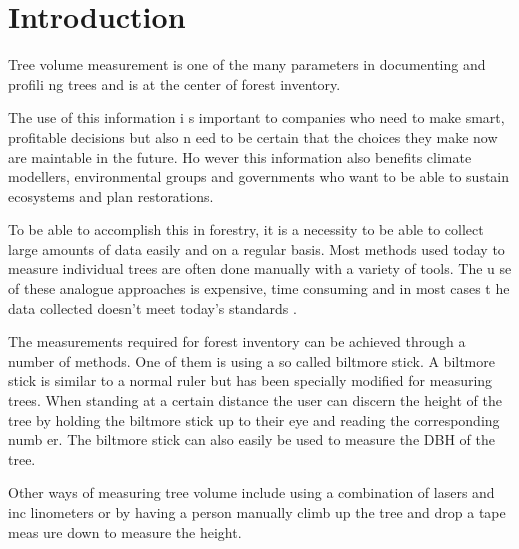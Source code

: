 

\newcommand{\degree}{$^\circ$}

\section{Introduction}
Tree volume measurement is one of the many parameters in documenting and profili
ng trees and is at the center of forest inventory. 

The use of this information i
s important to companies who need to make smart, profitable decisions but also n
eed to be certain that the choices they make now are maintable in the future. Ho
wever this information also benefits climate modellers, environmental groups and
 governments who want to be able to sustain ecosystems and plan restorations. 
 
 To
 be able to accomplish this in forestry, it is a necessity to be able to collect
 large amounts of data easily and on a regular basis. Most methods used today to
 measure individual trees are often done manually with a variety of tools. The u
se of these analogue approaches is expensive, time consuming and in most cases t
he data collected doesn't meet today's standards \cite{digital imaged based tree
 measurement for forest inventory}. 
 
The measurements required for forest inventory can be achieved through a number 
of methods. %
One of them is using a so called biltmore stick. A biltmore stick is
 similar to a normal ruler but has been specially modified for measuring trees. 
When standing at a certain distance the user can discern the height of the tree 
by holding the biltmore stick up to their eye and reading the corresponding numb
er. The biltmore stick can also easily be used to measure the DBH of the tree. %

Other ways of measuring tree volume include using a combination of lasers and inc
linometers or by having a person manually climb up the tree and drop a tape meas
ure down to measure the height. 


